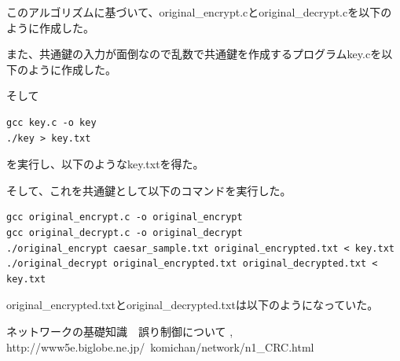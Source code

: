 \documentclass[a4j]{celb-report}
\begin{document}
このアルゴリズムに基づいて、original\_encrypt.cとoriginal\_decrypt.cを以下のように作成した。


また、共通鍵の入力が面倒なので乱数で共通鍵を作成するプログラムkey.cを以下のように作成した。

そして
\begin{lstlisting}[basicstyle=\ttfamily\footnotesize, frame=single]
gcc key.c -o key
./key > key.txt
\end{lstlisting}
を実行し、以下のようなkey.txtを得た。

そして、これを共通鍵として以下のコマンドを実行した。
\begin{lstlisting}[basicstyle=\ttfamily\footnotesize, frame=single]
gcc original_encrypt.c -o original_encrypt
gcc original_decrypt.c -o original_decrypt
./original_encrypt caesar_sample.txt original_encrypted.txt < key.txt
./original_decrypt original_encrypted.txt original_decrypted.txt < key.txt
\end{lstlisting}
original\_encrypted.txtとoriginal\_decrypted.txtは以下のようになっていた。
%


\begin{thebibliography}{9}
 ネットワークの基礎知識　誤り制御について , http://www5e.biglobe.ne.jp/~komichan/network/n1\_CRC.html
\end{thebibliography}
%
\end{document}
